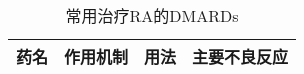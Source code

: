\begin{longtable}[]{p{3cm}p{4cm}p{4cm}p{4cm}}
    \caption{常用治疗RA的DMARDs}
    \label{tab16-4}\\
    \toprule
    药名                                                                                                                                                                                       & 作用机制                                                                                                                                & 用法                                                                                                                                                                               & 主要不良反应                                                                                                                                 \\
    \midrule
    \endhead
   

\end{longtable}
